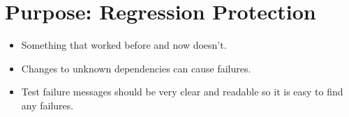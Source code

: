 \documentclass{article}
\begin{document}
\sloppy
\section{Purpose: Regression Protection}
\begin{itemize}
    \item Something that worked before and now doesn't.
    \item Changes to unknown dependencies can cause failures.
    \item Test failure messages should be very clear and readable so it is
        easy to find any failures.
\end{itemize}
\end{document}

